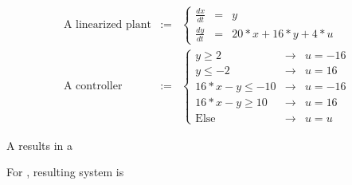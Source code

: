 \documentclass{seminar}
\begin{document}
\begin{slide}

\begin{eqnarray*}
\mbox{A linearized plant} & := &
\left\{\begin{array}{rcl}
\frac{dx}{dt} & = & y
\\
\frac{dy}{dt} & = & 20*x + 16*y + 4*u
\end{array}\right.
\\
\mbox{A controller} & := & 
\left\{
\begin{array}{rcl}
   y \geq 2 & \longrightarrow & u = -16
\\
   y \leq -2 & \longrightarrow & u = 16
\\
   16*x - y \leq -10 & \longrightarrow & u = -16
\\
   16*x - y \geq 10 & \longrightarrow & u = 16
\\
   \mbox{Else}  & \longrightarrow & u = u
\end{array}\right.
\end{eqnarray*}

A {} results in a {}

For {}, resulting system is {}

\end{slide}
\end{document}
